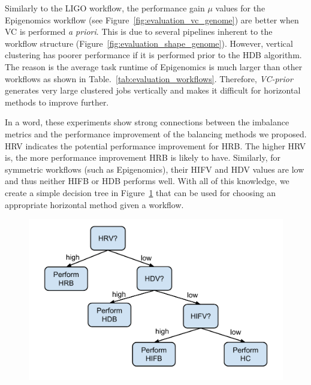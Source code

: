 Similarly to the LIGO workflow, the performance gain $\mu$ values for the Epigenomics workflow (see Figure~\ref{fig:evaluation_vc_genome}) are better when VC is performed \emph{a priori}. This is due to several pipelines inherent to the workflow structure (Figure~\ref{fig:evaluation_shape_genome}). However, vertical clustering has poorer performance if it is performed prior to the HDB algorithm. The reason is the average task runtime of Epigenomics is much larger than other workflows as shown in Table.~\ref{tab:evaluation_workflows}. Therefore, \emph{VC-prior} generates very large clustered jobs vertically and makes it difficult for horizontal methods to improve further. 


In a word, these experiments show strong connections between the imbalance metrics and the performance improvement of the balancing methods we proposed. HRV indicates the potential performance improvement for HRB. The higher HRV is, the more performance improvement HRB is likely to have. Similarly, for symmetric workflows (such as Epigenomics), their HIFV and HDV values are low and thus neither HIFB or HDB performs well. With all of this knowledge, we create a simple decision tree in Figure~\ref{fig:decision_tree} that can be used for choosing an appropriate horizontal method given a workflow. 


\begin{figure}[!htb]
	\centering
	\includegraphics[width=1.0\linewidth]{tree.pdf}
	\label{fig:decision_tree}
\end{figure}




